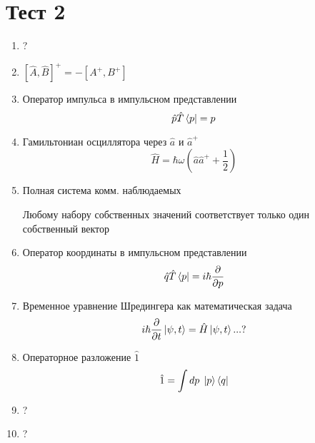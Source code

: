\section{Тест 2}
\begin{enumerate}
    \item ?
    \item $[\hat A,\hat B]^+=-[A^+,B^+]$
    \item Оператор импульса в импульсном представлении
        $$\hat p \hat T\bra{p}=p$$
    \item Гамильтониан осциллятора через $\hat a$ и $\hat a^+$
        $$\hat H=\hbar\omega(\hat a\hat a^++\frac{1}{2})$$
    \item Полная система комм. наблюдаемых

        Любому набору собственных значений соответствует только один 
        собственный вектор
    \item Оператор координаты в импульсном представлении
        $$\hat q\hat T\bra{p}=i\hbar\frac{\partial}{\partial p}$$
    \item Временное уравнение Шредингера как математическая задача
        $$i\hbar\frac{\partial}{\partial t}\ket{\psi,t}=\hat H\ket{\psi,t} ...?$$
    \item Операторное разложение $\hat 1$
        $$\hat 1=\int dp\;\ket{p}\bra{q}$$
    \item ?
    \item ?
\end{enumerate}
